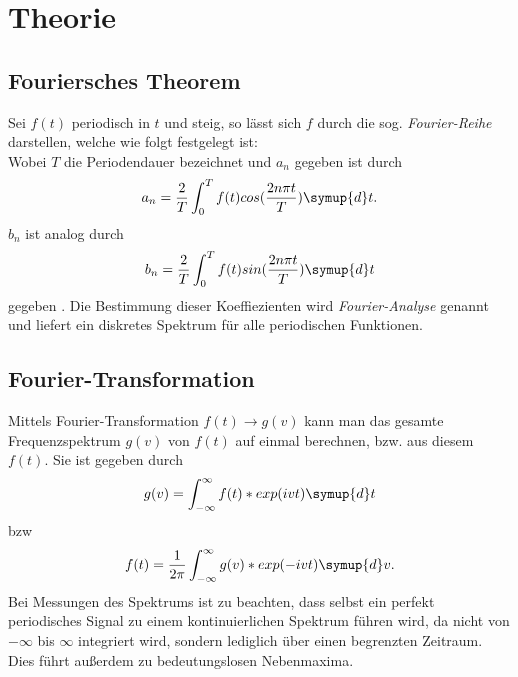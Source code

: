 \section{Theorie}
\label{sec:Theorie}

\subsection{Fouriersches Theorem}
\label{sec:Theorem}
Sei $f(t)$ periodisch in $t$ und steig, so lässt sich $f$ durch die sog. \textit{Fourier-Reihe} darstellen, welche wie folgt festgelegt ist:
\begin{equation}
  \label{eqn:Fourier-Reihe}
\end{equation}
Wobei $T$ die Periodendauer bezeichnet und $a_n$ gegeben ist durch
\begin{equation}
  a_n = \frac{2}{T} \int_0^T f(t) cos(\frac{2 n \pi t}{T}) \symup{d}t .
  \label{eqn:an}
\end{equation}
$b_n$ ist analog durch
\begin{equation}
  b_n = \frac{2}{T} \int_0^T f(t) sin(\frac{2 n \pi t}{T}) \symup{d}t
  \label{eqn:bn}
\end{equation}
gegeben \cite{sample}.
Die Bestimmung dieser Koeffiezienten wird \textit{Fourier-Analyse} genannt und liefert ein diskretes Spektrum für alle periodischen Funktionen.

\subsection{Fourier-Transformation}
\label{sec:Trafo}
Mittels Fourier-Transformation $f(t) \to g(v)$ kann man das gesamte Frequenzspektrum $g(v)$ von $f(t)$ auf einmal berechnen, bzw. aus diesem $f(t)$. Sie ist gegeben durch
\begin{equation}
  g(v) = \int_{-\infty}^{\infty} f(t)*exp(ivt) \symup{d}t
  \label{eq:trafo}
\end{equation}
bzw
\begin{equation}
  f(t) = \frac{1}{2\pi} \int_{-\infty}^{\infty} g(v)*exp(-ivt) \symup{d}v.
  \label{eq:backtrafo}
\end{equation}
Bei Messungen des Spektrums ist zu beachten, dass selbst ein perfekt periodisches Signal zu einem kontinuierlichen Spektrum führen wird, da nicht von $-\infty$ bis $\infty$ integriert wird, sondern lediglich über einen begrenzten Zeitraum. Dies führt außerdem zu bedeutungslosen Nebenmaxima.
